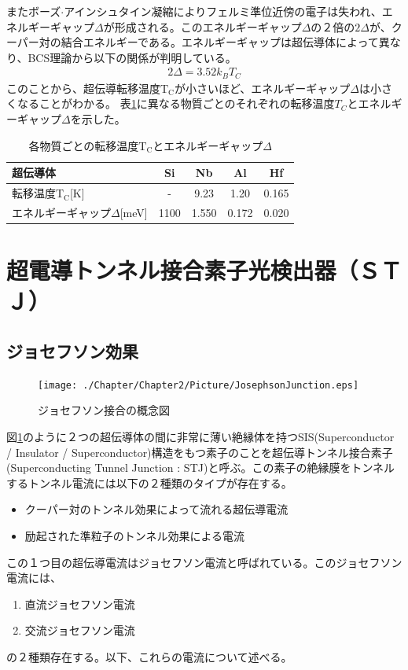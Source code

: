 またボーズ$\cdot$アインシュタイン凝縮によりフェルミ準位近傍の電子は失われ、エネルギーギャップ$\Delta$が形成される。このエネルギーギャップ$\Delta$の２倍の$2 \Delta$が、クーパー対の結合エネルギーである。エネルギーギャップは超伝導体によって異なり、BCS理論から以下の関係が判明している。
\begin{eqnarray}
2 \Delta = 3.52 k_{B} T_{C}
\label{eq:E_Tc}
\end{eqnarray}
このことから、超伝導転移温度$\mathrm{T_C}$が小さいほど、エネルギーギャップ$\Delta$は小さくなることがわかる。
表\ref{tab:TcDelta}に異なる物質ごとのそれぞれの転移温度$T_C$とエネルギーギャップ$\Delta$を示した。

\begin{table}[htb]
	\begin{center}
		\caption{各物質ごとの転移温度$\mathrm{T_C}$とエネルギーギャップ$\Delta$}
		\begin{tabular}{| l || c | c | c | c |} \hline
			超伝導体 & Si & Nb & Al & Hf \\ \hline \hline
			転移温度$\mathrm{T_C}$[K] & - & 9.23 & 1.20 & 0.165 \\ \hline
			エネルギーギャップ$\Delta$[meV] & 1100 & 1.550 & 0.172 & 0.020 \\ \hline
		\end{tabular}
		\label{tab:TcDelta}
	\end{center}
\end{table}

	
\section{超電導トンネル接合素子光検出器（ＳＴＪ）}

	\subsection{ジョセフソン効果}
	\begin{figure}[htbp]
  		\begin{center}
    			\texttt{[image: ./Chapter/Chapter2/Picture/JosephsonJunction.eps]}
    			\caption{ジョセフソン接合の概念図}
    			\label{fig:JosephsonJunction}
  		\end{center}
	\end{figure}
	図\ref{fig:JosephsonJunction}のように２つの超伝導体の間に非常に薄い絶縁体を持つSIS(Superconductor / Insulator / Superconductor)構造をもつ素子のことを超伝導トンネル接合素子(Superconducting Tunnel Junction : STJ)と呼ぶ。この素子の絶縁膜をトンネルするトンネル電流には以下の２種類のタイプが存在する。	
	\begin{itemize}
		\item クーパー対のトンネル効果によって流れる超伝導電流
		\item 励起された準粒子のトンネル効果による電流
	\end{itemize}	
	この１つ目の超伝導電流はジョセフソン電流と呼ばれている。このジョセフソン電流には、
	\begin{enumerate}
		\item 直流ジョセフソン電流
		\item 交流ジョセフソン電流
	\end{enumerate}
	の２種類存在する。以下、これらの電流について述べる。
